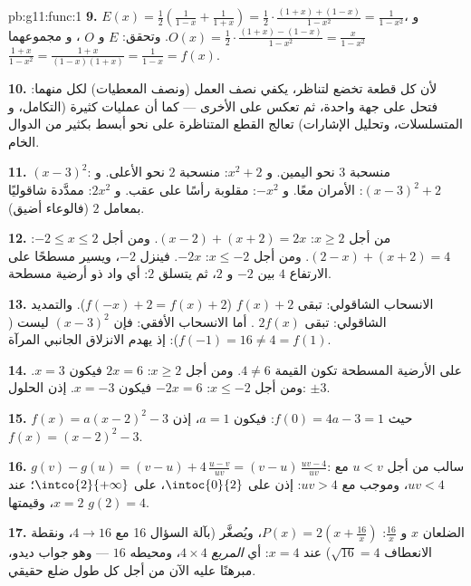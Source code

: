 \begin{solution}{pb:g11:func:1}
\textbf{9.} $E(x) = \frac12\left(\frac{1}{1 - x} + \frac{1}{1 +
x}\right) = \frac12 \cdot \frac{(1 + x) + (1 - x)}{1 - x^2}
= \frac{1}{1 - x^2}$، و
$O(x) = \frac12 \cdot \frac{(1 + x) - (1 - x)}{1 - x^2}
= \frac{x}{1 - x^2}$. وتحقق: $E$  و $O$ ، و
مجموعهما $\frac{1 + x}{1 - x^2} =
\frac{1 + x}{(1 - x)(1 + x)} = \frac{1}{1 - x} = f(x)$.

\textbf{10.} لأن كل قطعة تخضع لتناظر، يكفي نصف
العمل (ونصف المعطيات) لكل منهما: فتحل على جهة واحدة، ثم
تعكس على الأخرى --- كما أن عمليات كثيرة (التكامل، و
المتسلسلات، وتحليل الإشارات) تعالج القطع المتناظرة على نحو أبسط
بكثير من الدوال الخام.

\textbf{11.} $(x-3)^2$: منسحبة $3$ نحو اليمين. و $x^2 + 2$: منسحبة
$2$ نحو الأعلى. و $(x-3)^2 + 2$: الأمران معًا. و $-x^2$: مقلوبة رأسًا على عقب.
و $2x^2$: ممدَّدة شاقوليًا بمعامل $2$ (فالوعاء أضيق).

\textbf{12.} من أجل $x \geq 2$: $(x - 2) + (x + 2) = 2x$. ومن أجل
$-2 \leq x \leq 2$: $(2 - x) + (x + 2) = 4$. ومن أجل $x \leq -2$:
$-2x$. فينزل   $-2$، ويسير مسطحًا على الارتفاع
$4$ بين $-2$ و $2$، ثم يتسلق  $2$: أي واد
ذو أرضية مسطحة.

\textbf{13.} الانسحاب الشاقولي: تبقى $f(x) + 2$ 
($f(-x) + 2 = f(x) + 2$). والتمديد الشاقولي: تبقى $2f(x)$
. أما الانسحاب الأفقي: فإن $(x - 3)^2$ ليست 
($f(-1) = 16 \neq 4 = f(1)$): إذ يهدم الانزلاق الجانبي
المرآة.

\textbf{14.} على الأرضية المسطحة تكون القيمة $4 \neq 6$. ومن أجل
$x \geq 2$: $2x = 6$ فيكون $x = 3$. ومن أجل $x \leq -2$: $-2x = 6$ فيكون
$x = -3$. إذن الحلول: $\pm 3$.

\textbf{15.} $f(x) = a(x - 2)^2 - 3$ حيث $f(0) = 4a - 3 = 1$:
فيكون $a = 1$، إذن $f(x) = (x - 2)^2 - 3$.

\textbf{16.} $g(v) - g(u) = (v - u) + 4\,\frac{u - v}{uv}
= (v - u)\,\frac{uv - 4}{uv}$: سالب من أجل $u < v$ مع
$uv < 4$، وموجب مع $uv > 4$: إذن  على
$\intoc{0}{2}$،  على $\intco{2}{+\infty}$؛  عند
$x = 2$، وقيمتها $g(2) = 4$.

\textbf{17.} الضلعان $x$ و $\frac{16}{x}$:
$P(x) = 2\left(x + \frac{16}{x}\right)$، ويُصغَّر (بآلة السؤال
16 مع $4 \to 16$، ونقطة الانعطاف $\sqrt{16} = 4$)
عند $x = 4$: أي \emph{المربع} $4 \times 4$، ومحيطه $16$ ---
وهو جواب ديدو، مبرهنًا عليه الآن من أجل كل طول ضلع حقيقي.


\end{solution}

